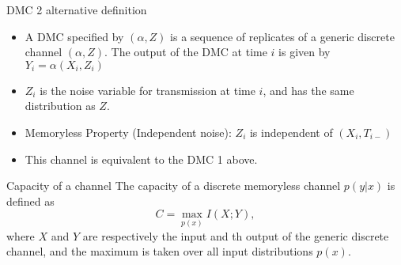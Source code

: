 \documentclass[../main.tex]{subfiles}
\begin{document}
\begin{pbox}{DMC 2 alternative definition}
    \begin{center}
\end{center}
\begin{itemize}
    \item A DMC specified by $(\alpha, Z)$ is a sequence of replicates of a generic discrete channel $(\alpha, Z)$. The output of the DMC at time $i$ is given by $Y_i=\alpha(X_i,Z_i)$
    \item $Z_i$ is the noise variable for transmission at time $i$, and has the same distribution as $Z$.
    \item Memoryless Property (Independent noise): $Z_i$ is independent of $(X_i, T_{i-})$
    \item This channel is equivalent to the DMC 1 above.
\end{itemize}
\end{pbox}
\begin{gbox}{Capacity of a channel}
    The capacity of a discrete memoryless channel $p(y|x)$ is defined as \[
    C =\max_{p(x)}I(X;Y), 
    \] where $X$ and $Y$ are respectively the input and th output of the generic discrete channel, and the maximum is taken over all input distributions $p(x)$.
\end{gbox}
\end{document}
